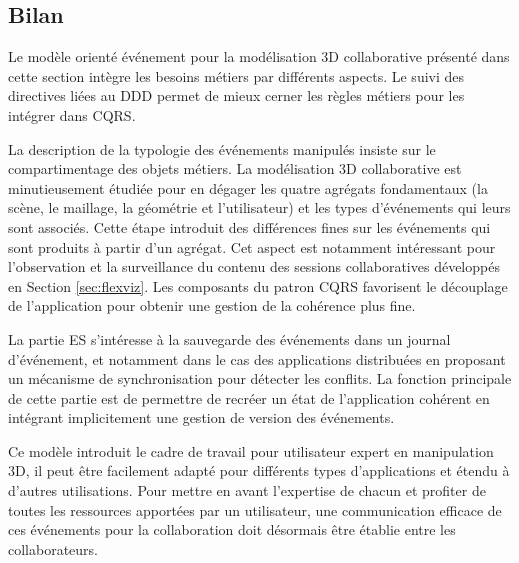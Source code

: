 \subsection{Bilan}

Le modèle orienté événement pour la modélisation 3D collaborative présenté dans 
cette section intègre les besoins métiers par différents aspects. Le suivi des 
directives liées au \gls{DDD} permet de mieux cerner les règles 
métiers pour les intégrer dans \gls{CQRS}. 

La description de la typologie des 
événements manipulés insiste sur le compartimentage des objets métiers. La 
modélisation 3D collaborative est minutieusement étudiée pour en dégager les quatre 
agrégats fondamentaux (la scène, le maillage, la géométrie et l'utilisateur) et les 
types d'événements qui leurs sont associés. Cette étape introduit des différences 
fines sur les événements qui sont produits à partir d'un agrégat. 
Cet aspect est notamment intéressant pour l'observation et la surveillance du 
contenu des sessions collaboratives développés en Section 
\ref{sec:flexviz}. 
Les composants du patron \gls{CQRS} favorisent le découplage de l'application 
pour obtenir une gestion de la cohérence plus fine. 

La partie \gls{ES} s'intéresse à la sauvegarde des événements dans un journal 
d'événement, et notamment dans le cas des applications distribuées en proposant 
un mécanisme de synchronisation pour détecter les conflits. La fonction principale 
de cette partie est de permettre de recréer un état de l'application cohérent en 
intégrant implicitement une gestion de version des événements.

Ce modèle introduit le cadre de travail pour utilisateur expert en manipulation 3D, il 
peut être facilement adapté pour différents types d'applications et étendu à 
d'autres utilisations. 
Pour mettre en avant l'expertise de chacun et profiter de 
toutes les ressources apportées par un utilisateur, une communication efficace de 
ces événements pour la collaboration doit désormais être établie entre les 
collaborateurs.